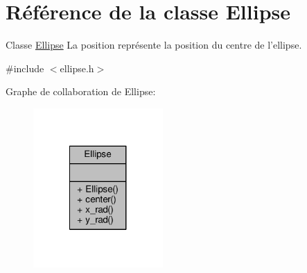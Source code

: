 \hypertarget{classEllipse}{\section{Référence de la classe Ellipse}
\label{classEllipse}
}


Classe \hyperlink{classEllipse}{Ellipse} La position représente la position du centre de l'ellipse.  




{\ttfamily \#include $<$ellipse.\+h$>$}



Graphe de collaboration de Ellipse\+:\nopagebreak
\begin{figure}[H]
\begin{center}
\leavevmode
\includegraphics[width=140pt]{da/d2b/classEllipse__coll__graph}
\end{center}
\end{figure}

